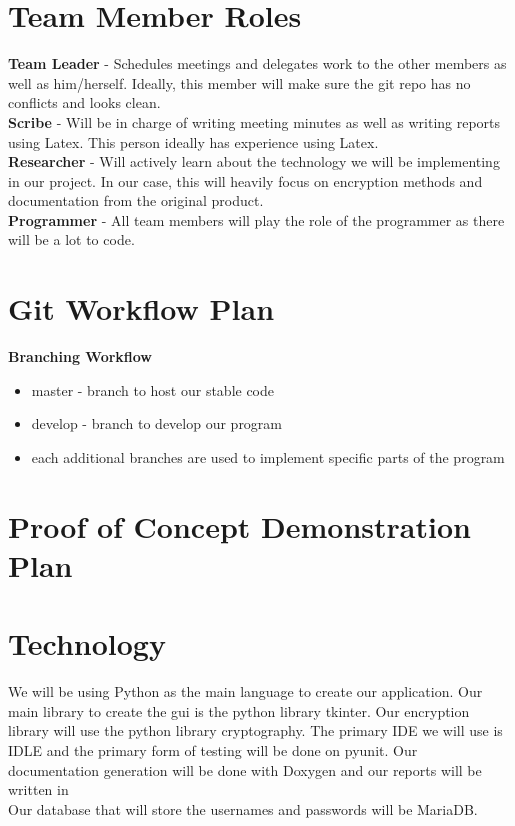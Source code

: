 \documentclass{article}
\begin{document}
\section{Team Member Roles}

\textbf{Team Leader} - Schedules meetings and delegates work to the other members as well as him/herself. Ideally, this member will make sure the git repo has no conflicts and looks clean.\\

\textbf{Scribe} - Will be in charge of writing meeting minutes as well as writing reports using Latex. This person ideally has experience using Latex.\\

\textbf{Researcher} - Will actively learn about the technology we will be implementing in our project. In our case, this will heavily focus on encryption methods and documentation from the original product.\\

\textbf{Programmer} - All team members will play the role of the programmer as there will be a lot to code.\\

\section{Git Workflow Plan}

\textbf{Branching Workflow}
\begin{itemize}
    \item master - branch to host our stable code
    \item develop - branch to develop our program
    \item each additional branches are used to implement specific parts of the program
\end{itemize}

\section{Proof of Concept Demonstration Plan}



\section{Technology}

We will be using Python as the main language to create our application. Our main library to create the gui is the python library tkinter. Our encryption library will use the python library cryptography. The primary IDE we will use is IDLE and the primary form of testing will be done on pyunit. Our documentation generation will be done with Doxygen and our reports will be written in \latex \\
Our database that will store the usernames and passwords will be MariaDB.
\end{document}
